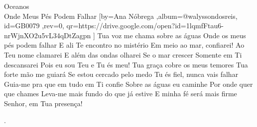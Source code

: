 \beginsong
{Oceanos \\ Onde Meus Pés Podem Falhar %
}[by={Ana Nóbrega %
},album={@walyssondosreis},
id={GB0079 %
},rev={0}, %
qr={https://drive.google.com/open?id=1lqmfFtau6-nrWjnXO2u5vL34qDtZagpn %
}]
\beginverse*
Tua voz me chama sobre as águas
Onde os meus pés podem falhar
E ali Te encontro no mistério
Em meio ao mar, confiarei!
\endverse
\beginchorus
Ao Teu nome clamarei
E além das ondas olharei
Se o mar crescer
Somente em Ti descansarei
Pois eu sou Teu e Tu és meu!
\endchorus
\beginverse*
Tua graça cobre os meus temores
Tua forte mão me guiará
Se estou cercado pelo medo
Tu és fiel, nunca vais falhar
\endverse
\beginverse*
Guia-me pra que em tudo em Ti confie
Sobre as águas eu caminhe
Por onde quer que chames
Leva-me mais fundo do que já estive
E minha fé será mais firme
Senhor, em Tua presença!
\endverse


\beginverse*\color{white}
.
\endverse
\begin{comment}
\lstset{basicstyle=\scriptsize\bf} %
\tab{Solo 1}
\begin{lstlisting}
E|-----------------------------------------------------|
B|-----------------------------------------------------|
G|-----------------------------------------------------|
D|-----------------------------------------------------|
A|-----------------------------------------------------|
E|-----------------------------------------------------|
\end{lstlisting}
\end{comment}
 
